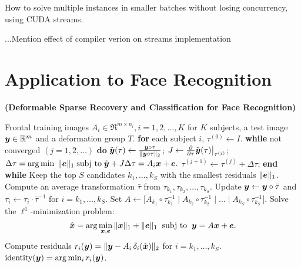 \documentclass[10pt,twocolumn,letterpaper]{article}
\begin{document}
How to solve multiple instances in smaller batches without losing concurrency, using CUDA streams.

...Mention effect of compiler verion on streams implementation

\section{Application to Face Recognition}
\begin{algorithm}[thb]
\caption{\bf (Deformable Sparse Recovery and Classification for
Face Recognition)} \label{alg:deformable-src}
\begin{algorithmic}[1]
 Frontal training images $A_i \in \Re^{m\times n_i}, i=1,2,\ldots,K$ for $K$ subjects,  a test image
${\boldsymbol{y}}\in\mathbb R^m$ and a deformation group $T$. 
\STATE
{\bf for} each subject $i$, 
\STATE \hspace{3mm} $\tau^{(0)}
\leftarrow I$. 
\STATE \hspace{3mm} {\bf while} not converged $(j=1,2,\ldots)$ {\bf do} 
\STATE \hspace{6mm}
$\tilde {{\boldsymbol{y}}}(\tau) \leftarrow \frac{{\boldsymbol{y}} \circ \tau}{\|{\boldsymbol{y}} \circ
\tau\|_2}$; \;\;\; $J \leftarrow  \frac{\partial}{\partial
\tau} \tilde{{\boldsymbol{y}}}(\tau)  \bigr|_{\tau^{(j)}} $;
\STATE \hspace{6mm} $ \Delta \tau =  \arg\min \; \| \boldsymbol{e} \|_1  \;
\textup{subj to} \; \tilde {{\boldsymbol{y}}} + J \Delta \tau = A_i {\boldsymbol{x}} + \boldsymbol{e}.$ 
\STATE
\hspace{6mm} $\tau^{(j+1)} \leftarrow \tau^{(j)} + \Delta
\tau$; 
\STATE \hspace{3mm} {\bf end while}  \STATE Keep
the top $S$ candidates $k_1, \ldots, k_S$ with the smallest
residuals $\|\boldsymbol{e}\|_1$. \STATE Compute an average transformation
$\bar{\tau}$ from $\tau_{k_1}, \tau_{k_2}, \ldots, \tau_{k_S}$.
\STATE Update ${\boldsymbol{y}} \leftarrow {\boldsymbol{y}} \circ \bar{\tau}$ and $\tau_i
\leftarrow \tau_i \cdot \bar{\tau}^{-1}$ for $i = k_1, \dots,
k_S$. \STATE Set $A \leftarrow \big[ A_{k_1} \circ
\tau_{k_1}^{-1} \mid A_{k_2} \circ \tau_{k_2}^{-1} \mid \dots
\mid A_{k_S} \circ \tau_{k_S}^{-1} \big]$. \STATE Solve the
$\ell^1$-minimization problem:
$$\hat{{\boldsymbol{x}}} = \arg \min_{{\boldsymbol{x}}, \boldsymbol{e}} \| {\boldsymbol{x}} \|_1 + \|\boldsymbol{e}\|_1 \;\; \textup{subj to} \;\; {\boldsymbol{y}} = A {\boldsymbol{x}} + \boldsymbol{e}.$$
\STATE Compute residuals $r_i({\boldsymbol{y}}) = \| {{\boldsymbol{y}}} - {A}_i \, \delta_i(\hat{{\boldsymbol{x}}}) \|_2$ for $i = k_1, \dots, k_S$.
 $\mbox{identity}({\boldsymbol{y}}) = \arg\min_i r_i({\boldsymbol{y}})$.
\end{algorithmic}
\end{algorithm}


{\small


}
\end{document}

